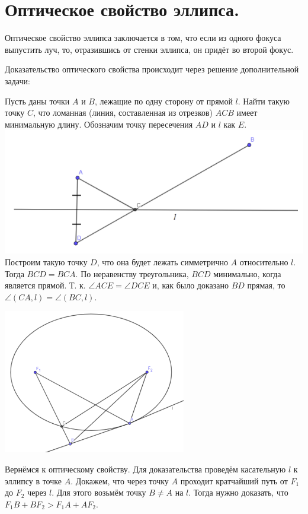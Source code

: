 \documentclass[12pt]{article}
\begin{document}
\begin{sloppypar}
    \section{Оптическое свойство эллипса.}
    Оптическое свойство эллипса заключается в том, что если из одного фокуса выпустить луч, то, отразившись от стенки эллипса, он придёт во второй фокус.

    Доказательство оптического свойства происходит через решение дополнительной задачи:

    Пусть даны точки $A$ и $B$, лежащие по одну сторону от прямой $l$. Найти такую точку $C$, что ломанная (линия, составленная из отрезков) $ACB$ имеет минимальную длину. Обозначим точку пересечения $AD$ и $l$ как $E$.
    \includegraphics[width=1\textwidth]{graphics/Вспомогательная.png}
    Построим такую точку $D$, что она будет лежать симметрично $A$ относительно $l$. Тогда $BCD = BCA$. По неравенству треугольника, $BCD$ минимально, когда является прямой. Т. к. $\angle ACE = \angle DCE$ и, как было доказано $BD$ прямая, то $\angle (CA, l) = \angle (BC, l)$.


    \includegraphics[width=0.6\textwidth]{graphics/Эллипс.png}

    Вернёмся к оптическому свойству. Для доказательства проведём касательную $l$ к эллипсу в точке $A$.
    Докажем, что через точку $A$ проходит кратчайший путь от $F_1$ до $F_2$ через $l$. Для этого возьмём точку $B \neq A$ на $l$.
    Тогда нужно доказать, что $F_1B + BF_2 > F_1A + AF_2$.


\end{sloppypar}
\end{document}
